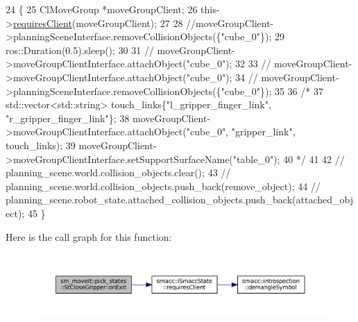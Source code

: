 \begin{DoxyCode}
24    \{
25       ClMoveGroup *moveGroupClient;
26       this->\hyperlink{classsmacc_1_1ISmaccState_a7f95c9f0a6ea2d6f18d1aec0519de4ac}{requiresClient}(moveGroupClient);
27 
28       \textcolor{comment}{//moveGroupClient->planningSceneInterface.removeCollisionObjects(\{"cube\_0"\});}
29       ros::Duration(0.5).sleep();
30 
31       \textcolor{comment}{// moveGroupClient->moveGroupClientInterface.attachObject("cube\_0");}
32 
33       \textcolor{comment}{// moveGroupClient->moveGroupClientInterface.attachObject("cube\_0");}
34       \textcolor{comment}{// moveGroupClient->planningSceneInterface.removeCollisionObjects(\{"cube\_0"\});}
35 
36       \textcolor{comment}{/*}
37 \textcolor{comment}{         std::vector<std::string> touch\_links\{"l\_gripper\_finger\_link", "r\_gripper\_finger\_link"\};}
38 \textcolor{comment}{         moveGroupClient->moveGroupClientInterface.attachObject("cube\_0", "gripper\_link", touch\_links);}
39 \textcolor{comment}{         moveGroupClient->moveGroupClientInterface.setSupportSurfaceName("table\_0");}
40 \textcolor{comment}{         */}
41 
42       \textcolor{comment}{// planning\_scene.world.collision\_objects.clear();}
43       \textcolor{comment}{// planning\_scene.world.collision\_objects.push\_back(remove\_object);}
44       \textcolor{comment}{// planning\_scene.robot\_state.attached\_collision\_objects.push\_back(attached\_object);}
45    \}
\end{DoxyCode}
Here is the call graph for this function\+:
\nopagebreak
\begin{figure}[H]
\begin{center}
\leavevmode
\includegraphics[width=350pt]{structsm__moveit_1_1pick__states_1_1StCloseGripper_aaa0ec979ec47ffea358d2375c1ed0910_cgraph}
\end{center}
\end{figure}
\mbox{\label{structsm__moveit_1_1pick__states_1_1StCloseGripper_a1eb83e8ead707d9b9b92255070ea2fe5}} 
